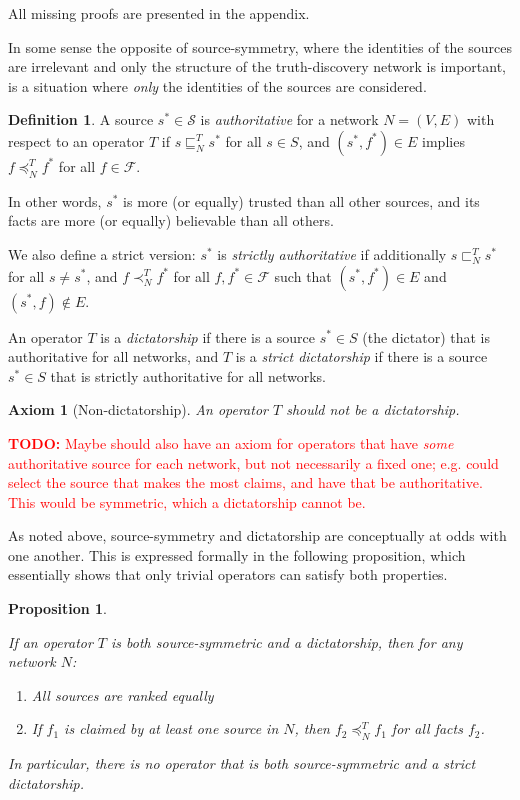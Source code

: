 \documentclass{article}
\theoremstyle{definition} \newtheorem{definition}{Definition}
\theoremstyle{definition} \newtheorem{example}{Example}
\theoremstyle{plain} \newtheorem{axiom}{Axiom}
\theoremstyle{plain} \newtheorem*{remark}{Remark}
\theoremstyle{remark} \newtheorem*{notation}{Notation}
\theoremstyle{plain} \newtheorem{lemma}{Lemma}
\theoremstyle{plain} \newtheorem{theorem}{Theorem}
\theoremstyle{plain} \newtheorem{proposition}{Proposition}
\newcommand{\todo}[1] {
    \textcolor{red}{
        \textbf{TODO:} #1
    }
}
\renewcommand{\S}{\mathcal{S}}  %
\newcommand{\F}{\mathcal{F}}
\newcommand{\sle}{\sqsubseteq}
\newcommand{\slt}{\sqsubset}
\newcommand{\fle}{\preceq}
\newcommand{\flt}{\prec}
\begin{document}
All missing proofs are presented in the appendix.

In some sense the opposite of source-symmetry, where the identities of the
sources are irrelevant and only the structure of the truth-discovery network is
important, is a situation where \emph{only} the identities of the sources are
considered.

\begin{definition}

A source $s^* \in \S$ is \emph{authoritative} for a network $N=(V, E)$ with
respect to an operator $T$ if $s \sle_N^T s^*$ for all $s \in S$, and $(s^*,
f^*) \in E$ implies $f \fle_N^T f^*$ for all $f \in \F$.

In other words, $s^*$ is more (or equally) trusted than all other sources, and
its facts are more (or equally) believable than all others.

We also define a strict version: $s^*$ is \emph{strictly authoritative} if
additionally $s \slt_N^T s^*$ for all $s \ne s^*$, and $f \flt_N^T f^*$ for all
$f, f^* \in \F$ such that $(s^*, f^*) \in E$ and $(s^*, f) \notin E$.

An operator $T$ is a \emph{dictatorship} if there is a source $s^* \in S$ (the
dictator) that is authoritative for all networks, and $T$ is a \emph{strict
dictatorship} if there is a source $s^* \in S$ that is strictly authoritative
for all networks.

\end{definition}

\begin{axiom}[Non-dictatorship]
\label{axiom:non_dict}
An operator $T$ should not be a dictatorship.
\end{axiom}

\todo{
    Maybe should also have an axiom for operators that have \emph{some}
    authoritative source for each network, but not necessarily a fixed one;
    e.g. could select the source that makes the most claims, and have that be
    authoritative. This would be symmetric, which a dictatorship cannot be.
}

As noted above, source-symmetry and dictatorship are conceptually at odds with
one another. This is expressed formally in the following proposition, which
essentially shows that only trivial operators can satisfy both properties.

\begin{proposition}
\label{prop:symm_and_dict}

If an operator $T$ is both source-symmetric and a dictatorship, then for any
network $N$:
\begin{enumerate}
\item All sources are ranked equally
\item If $f_1$ is claimed by at least one source in $N$, then $f_2 \fle_N^T
f_1$ for all facts $f_2$.
\end{enumerate}

In particular, there is no operator that is both source-symmetric and a strict
dictatorship.
\end{proposition}
\end{document}
